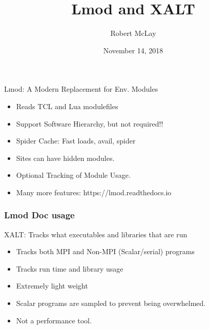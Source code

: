 \documentclass{beamer}
\begin{document}
\title[Lmod/XALT]{Lmod and XALT}
\author{Robert McLay} 
\date{November 14, 2018} 

\frame{\titlepage} 

\begin{frame}{Lmod: A Modern Replacement for Env. Modules}
  \begin{itemize}
    \item Reads TCL and Lua modulefiles
    \item Support Software Hierarchy, but not required!!
    \item Spider Cache: Fast loads, avail, spider
    \item Sites can have hidden modules.
    \item Optional Tracking of Module Usage.
    \item Many more features: https://lmod.readthedocs.io
  \end{itemize}
\end{frame}

\begin{frame}[fragile]
    \frametitle{Lmod Doc usage}
\end{frame}

\begin{frame}{XALT: Tracks what executables and libraries that are run}
  \begin{itemize}
    \item Tracks both MPI and Non-MPI (Scalar/serial) programs
    \item Tracks run time and library usage
    \item Extremely light weight
    \item Scalar programs are sampled to prevent being overwhelmed.
    \item Not a performance tool.
  \end{itemize}
\end{frame}
\end{document}

